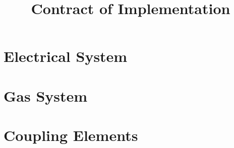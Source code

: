 \documentclass{article}
\title{Contract of Implementation}
\begin{document}
\maketitle







\section{Electrical System}





\section{Gas System}





\section{Coupling Elements}



\newpage
\printglossaries
\end{document}
